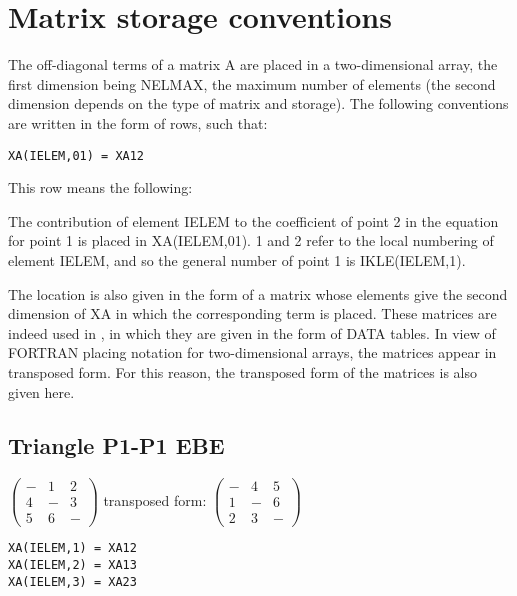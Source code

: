 \chapter{Matrix storage conventions}

The off-diagonal terms of a matrix A are placed in a two-dimensional array, the
first dimension being NELMAX, the maximum number of elements (the second
dimension depends on the type of matrix and storage). The following conventions
are written in the form of rows, such that:

\begin{lstlisting}[language=TelFortran]
XA(IELEM,01) = XA12
\end{lstlisting}

This row means the following:

The contribution of element IELEM to the coefficient of point 2 in the equation
for point 1 is placed in XA(IELEM,01). 1 and 2 refer to the local numbering of
element IELEM, and so the general number of point 1 is IKLE(IELEM,1).

The location is also given in the form of a matrix whose elements give the
second dimension of XA in which the corresponding term is placed. These
matrices are indeed used in \bief, in which they are given in the form of DATA
tables. In view of FORTRAN placing notation for two-dimensional arrays, the
matrices appear in transposed form. For this reason, the transposed form of the
matrices is also given here.

\section{Triangle P1-P1 EBE}

$\left(\begin{array}{ccc}
    {-} & {1} & {2} \\
    {4} & {-} & {3} \\
    {5} & {6} & {-}
\end{array}\right)$
transposed form:
$\left(\begin{array}{ccc}
    {-} & {4} & {5} \\
    {1} & {-} & {6} \\
    {2} & {3} & {-}
\end{array}\right)$


\begin{lstlisting}[language=TelFortran]
XA(IELEM,1) = XA12
XA(IELEM,2) = XA13
XA(IELEM,3) = XA23
\end{lstlisting}

